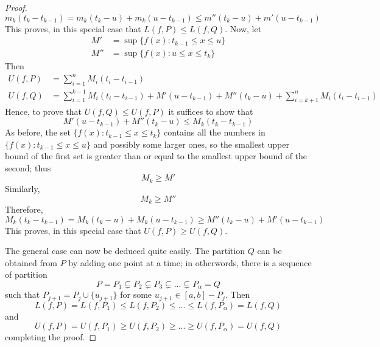 \begin{proof}
\begin{equation*}
        m_k(t_k-t_{k-1}) = m_k(t_k-u)+m_k(u-t_{k-1}) \leq m''(t_k-u)+m'(u-t_{k-1})
    \end{equation*}
    This proves, in this special case that $L(f,P) \leq L(f,Q)$. Now, let \begin{align*}
        M' &= \sup\{f(x):t_{k-1} \leq x \leq u\} \\
        M'' &= \sup\{f(x):u \leq x \leq t_k\}
    \end{align*}
    Then \begin{align*}
        U(f,P) &= \sum\limits_{i=1}^nM_i(t_i - t_{i-1}) \\
        U(f,Q) &= \sum\limits_{i=1}^{k-1}M_i(t_i - t_{i-1}) + M'(u-t_{k-1}) + M''(t_k-u) + \sum\limits_{i=k+1}^nM_i(t_i - t_{i-1})
    \end{align*}
    Hence, to prove that $U(f,Q) \leq U(f,P)$ it suffices to show that \begin{equation*}
        M'(u-t_{k-1}) + M''(t_k - u) \leq M_k(t_k-t_{k-1})
    \end{equation*}
    As before, the set $\{f(x):t_{k-1}\leq x \leq t_k\}$ contains all the numbers in $\{f(x):t_{k-1}\leq x \leq u\}$ and possibly some          larger ones, so the smallest upper bound of the first set is greater than or equal to the smallest upper bound of the second; thus          \begin{equation*}
        M_k \geq M'
    \end{equation*}
    Similarly, \begin{equation*}
        M_k \geq M''
    \end{equation*}
    Therefore, \begin{equation*}
        M_k(t_k-t_{k-1}) = M_k(t_k - u) + M_k(u-t_{k-1}) \geq M''(t_k-u) + M'(u-t_{k-1})
    \end{equation*}
    This proves, in this special case that $U(f,P) \geq U(f,Q)$.


    The general case can now be deduced quite easily. The partition $Q$ can be obtained from $P$ by adding one point at a time; in otherwords, there is a sequence of partition \begin{equation*}
        P = P_1\subsetneq P_2 \subsetneq P_3 \subsetneq ... \subsetneq P_{\alpha} = Q
    \end{equation*}
    such that $P_{j+1} = P_j\cup\{u_{j+1}\}$ for some $u_{j+1} \in [a,b]-P_j$. Then \begin{equation*}
        L(f,P) = L(f,P_1) \leq L(f,P_2) \leq ... \leq L(f,P_{\alpha}) = L(f,Q)
    \end{equation*}
    and \begin{equation*}
        U(f,P) = U(f,P_1) \geq U(f,P_2) \geq ... \geq U(f,P_{\alpha}) = U(f,Q)
    \end{equation*}
    completing the proof.
\end{proof}



